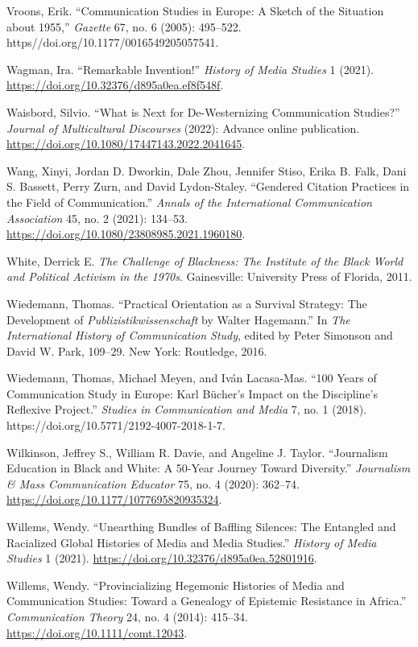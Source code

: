 \documentclass{tufte-handout}
\begin{document}
\begin{hangparas}{.25in}{1}
Vroons, Erik. ``Communication Studies in Europe: A Sketch of the
Situation about 1955,'' \emph{Gazette} 67, no. 6 (2005): 495--522.
https//doi.org/10.1177/0016549205057541.

Wagman, Ira. ``Remarkable Invention!'' \emph{History of Media Studies} 1
(2021). \url{https://doi.org/10.32376/d895a0ea.ef8f548f}.

Waisbord, Silvio. ``What is Next for De-Westernizing Communication
Studies?'' \emph{Journal of Multicultural Discourses} (2022): Advance
online publication. \url{https://doi.org/10.1080/17447143.2022.2041645}.

Wang, Xinyi, Jordan D. Dworkin, Dale Zhou, Jennifer Stiso, Erika B.
Falk, Dani S. Bassett, Perry Zurn, and David Lydon-Staley. ``Gendered
Citation Practices in the Field of Communication.'' \emph{Annals of the
International Communication Association} 45, no. 2 (2021): 134--53.
\url{https://doi.org/10.1080/23808985.2021.1960180}.

White, Derrick E. \emph{The Challenge of Blackness: The Institute of the
Black World and Political Activism in the 1970s}. Gainesville:
University Press of Florida, 2011.

Wiedemann, Thomas. ``Practical Orientation as a Survival Strategy: The
Development of \emph{Publizistikwissenschaft} by Walter Hagemann.'' In
\emph{The International History of Communication Study}, edited by Peter
Simonson and David W. Park, 109--29. New York: Routledge, 2016.

Wiedemann, Thomas, Michael Meyen, and Iván Lacasa-Mas. ``100 Years of
Communication Study in Europe: Karl Bücher's Impact on the Discipline's
Reflexive Project.'' \emph{Studies in Communication and Media} 7, no. 1
(2018). https://doi.org/10.5771/2192-4007-2018-1-7.

Wilkinson, Jeffrey S., William R. Davie, and Angeline J. Taylor.
``Journalism Education in Black and White: A 50-Year Journey Toward
Diversity.'' \emph{Journalism \& Mass Communication Educator} 75, no. 4
(2020): 362--74. \url{https://doi.org/10.1177/1077695820935324}.

Willems, Wendy. ``Unearthing Bundles of Baffling Silences: The Entangled
and Racialized Global Histories of Media and Media Studies.''
\emph{History of Media Studies} 1 (2021).
\url{https://doi.org/10.32376/d895a0ea.52801916}.

Willems, Wendy. ``Provincializing Hegemonic Histories of Media and
Communication Studies: Toward a Genealogy of Epistemic Resistance in
Africa.'' \emph{Communication Theory} 24, no. 4 (2014): 415--34.
\url{https://doi.org/10.1111/comt.12043}.


\end{hangparas}
\end{document}
